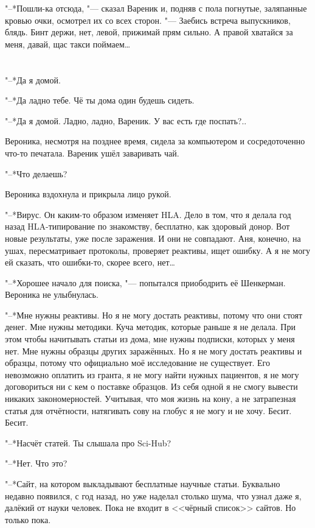"--*Пошли-ка отсюда, "--- сказал Вареник и, подняв с пола погнутые, заляпанные кровью очки, осмотрел их со всех сторон.
"--- Заебись встреча выпускников, блядь.
Бинт держи, нет, левой, прижимай прям сильно.
А правой хватайся за меня, давай, щас такси поймаем\dots{}

\chapter{}

\label{Sun_2012_07_22}

"--*Да я домой.

"--*Да ладно тебе.
Чё ты дома один будешь сидеть.

"--*Да я домой.
Ладно, ладно, Вареник.
У вас есть где поспать?..

Вероника, несмотря на позднее время, сидела за компьютером и сосредоточенно что-то печатала.
Вареник ушёл заваривать чай.

"--*Что делаешь?

Вероника вздохнула и прикрыла лицо рукой.

"--*Вирус.
Он каким-то образом изменяет HLA.
Дело в том, что я делала год назад HLA-типирование по знакомству, бесплатно, как здоровый донор.
Вот новые результаты, уже после заражения.
И они не совпадают.
Аня, конечно, на ушах, пересматривает протоколы, проверяет реактивы, ищет ошибку.
А я не могу ей сказать, что ошибки-то, скорее всего, нет\dots{}

"--*Хорошее начало для поиска, "--- попытался приободрить её Шенкерман.
Вероника не улыбнулась.

"--*Мне нужны реактивы.
Но я не могу достать реактивы, потому что они стоят денег.
Мне нужны методики.
Куча методик, которые раньше я не делала.
При этом чтобы начитывать статьи из дома, мне нужны подписки, которых у меня нет.
Мне нужны образцы других заражённых.
Но я не могу достать реактивы и образцы, потому что официально моё исследование не существует.
Его невозможно оплатить из гранта, я не могу найти нужных пациентов, я не могу договориться ни с кем о поставке образцов.
Из себя одной я не смогу вывести никаких закономерностей.
Учитывая, что моя жизнь на кону, а не затрапезная статья для отчётности, натягивать сову на глобус я не могу и не хочу.
Бесит.
Бесит.

"--*Насчёт статей.
Ты слышала про Sci-Hub?

"--*Нет.
Что это?

"--*Сайт, на котором выкладывают бесплатные научные статьи.
Буквально недавно появился, с год назад, но уже наделал столько шума, что узнал даже я, далёкий от науки человек.
Пока не входит в <<чёрный список>> сайтов.
Но только пока.


